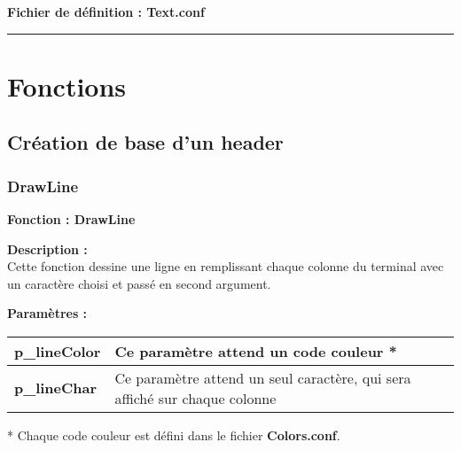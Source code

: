 \documentclass[a4paper,10pt]{article}
\begin{document}
\textbf{Fichier de définition : \color{lime}Text.conf}\\[1\baselineskip]





\color{red}\par\noindent\rule{\textwidth}{0.4pt}\color{white}

\color{red}
\section{Fonctions}\color{white}

\color{green}
\subsection{Création de base d'un header}\color{white}

\color{blue}
\subsubsection{DrawLine}\color{white}

\textbf{Fonction : \color{mauve}DrawLine}\\[1\baselineskip]

\begin{justify}
    \textbf{Description :}\\
    Cette fonction dessine une ligne en remplissant chaque colonne du terminal avec un caractère choisi et passé en second argument.
\end{justify}

\textbf{Paramètres :}\\[1\baselineskip]
\begin{tabular}{|l|l|}
\hline
\textbf{\color{orange}p\_lineColor} & Ce paramètre attend un code couleur * \\
\hline
\textbf{\color{orange}p\_lineChar} & Ce paramètre attend un seul caractère, qui sera affiché sur chaque colonne \\
\hline
\end{tabular}


\begin{justify}
    * Chaque code couleur est défini dans le fichier \textbf{\color{lime}Colors.conf}.
\end{justify}
\end{document}
